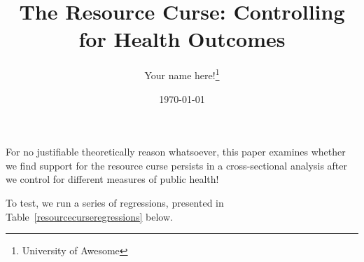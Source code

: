 \documentclass[12pt]{article}
\title{The Resource Curse: Controlling for Health Outcomes}
\author{Your name here!\footnote{University of Awesome}}
\date{\today}
\begin{document}
\maketitle


For no justifiable theoretically reason whatsoever, this paper examines whether we find support for the resource curse persists in a cross-sectional analysis after we control for different measures of public health!

To test, we run a series of regressions, presented in Table~\ref{resourcecurseregressions} below.

\end{document}
